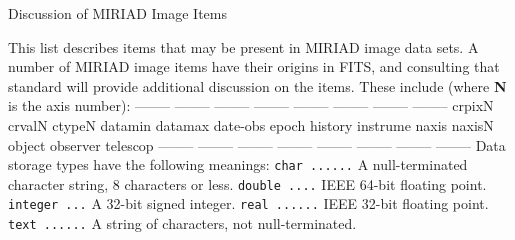 %
%

\beginsection Discussion of MIRIAD Image Items

This list describes items that may be present in MIRIAD image data
sets.  A number of MIRIAD image items have their origins in FITS,
and consulting that standard will provide additional discussion on the
items.  These include (where {\bf N} is the axis number):
{\ninepoint\begintt
-------- -------- -------- -------- -------- -------- -------- --------
crpixN   crvalN   ctypeN   datamin  datamax  date-obs epoch    history
instrume naxis    naxisN   object   observer telescop
-------- -------- -------- -------- -------- -------- -------- --------
\endtt}
Data storage types have the following meanings:
\vskip 0.2in
{\ninepoint\parskip=0.0in
{\tt char ......} A null-terminated character string, 8 characters or
less. \newline
{\tt double ....} IEEE 64-bit floating point. \newline
{\tt integer ...} A 32-bit signed integer. \newline
{\tt real ......} IEEE 32-bit floating point. \newline
{\tt text ......} A string of characters, not null-terminated. \newline
}
\vskip 0.4in
